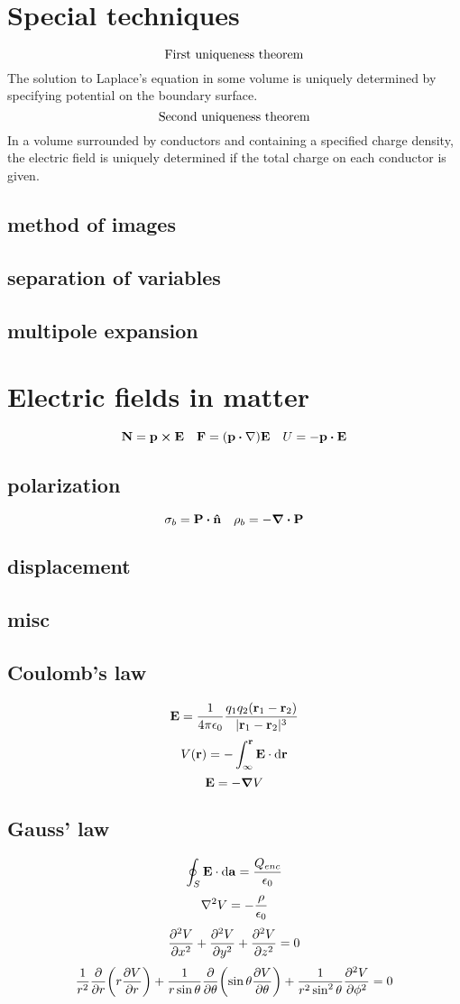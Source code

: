 \documentclass[12pt]{article}
\begin{document}
\section*{Special techniques}
\[\qq{First uniqueness theorem}\]
The solution to Laplace's equation in some volume is uniquely determined by specifying potential on the boundary surface.
\[\qq{Second uniqueness theorem}\]
In a volume surrounded by conductors and containing a specified charge density, the electric field is uniquely determined if the total charge on each conductor is given.
\subsection*{method of images}
\subsection*{separation of variables}
\subsection*{multipole expansion}
\section*{Electric fields in matter}
\[\vb{N}=\vb{p}\cp\vb{E}\quad\vb{F}=\qty(\vb{p}\vdot\nabla)\vb{E}\quad U=-\vb{p}\vdot\vb{E}\]
\subsection*{polarization}
\[\sigma_b=\vb{P}\vdot\vu{n}\quad\rho_b=-\div{\vb{P}}\]
\subsection*{displacement}

\subsection*{misc}
\subsection*{Coulomb's law}
\[\vb{E}=\frac{1}{4\pi\epsilon_0}\frac{q_1q_2(\vb{r}_1-\vb{r}_2)}{|\vb{r}_1-\vb{r}_2|^3}\]
\[V(\vb{r})=-\int_\infty^{\vb{r}}\vb{E}\cdot\dd\vb{r}\]
\[\vb{E}=-\grad{V}\]
\subsection*{Gauss' law}
\[\oint_S{\vb{E}\cdot\dd{\vb{a}}}=\frac{Q_{enc}}{\epsilon_0}\]
\[\laplacian{V}=-\frac{\rho}{\epsilon_0}\]
\[\pdv[2]{V}{x}+\pdv[2]{V}{y}+\pdv[2]{V}{z}=0\]
\[\frac{1}{r^2}\pdv{r}\qty(r\pdv{V}{r})+\frac{1}{r\sin\theta}\pdv{\theta}\qty(\sin\theta\pdv{V}{\theta})+\frac{1}{r^2\sin^2\theta}\pdv[2]{V}{\phi}=0\]
\end{document}
